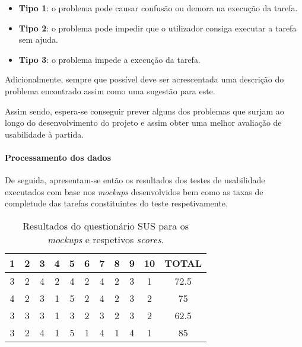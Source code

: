 \begin{itemize}
\item \textbf{Tipo 1}: o problema pode causar confusão ou demora na execução da tarefa.
\item \textbf{Tipo 2}: o problema pode impedir que o utilizador consiga executar a tarefa
sem ajuda.
\item \textbf{Tipo 3}: o problema impede a execução da tarefa.
\end{itemize}

Adicionalmente, sempre que possível deve ser acrescentada uma descrição do
problema encontrado assim como uma sugestão para este.

Assim sendo, espera-se conseguir prever alguns dos problemas que surjam ao
longo do desenvolvimento do projeto e assim obter uma melhor avaliação de
usabilidade à partida.

\paragraph{Processamento dos dados}
\label{sec:org2d14279}

De seguida, apresentam-se então os resultados dos testes de usabilidade executados com base nos \textit{mockups} desenvolvidos bem como as taxas de completude das tarefas constituintes do teste respetivamente.

\begin{table}[H]
\centering
\caption{Resultados do questionário SUS para os \textit{mockups} e respetivos \textit{scores}.}
\begin{tabular}{ccccccccccc}
\hline
\rowcolor[HTML]{EFEFEF} 
\textbf{1} & \textbf{2} & \textbf{3} & \textbf{4} & \textbf{5} & \textbf{6} & \textbf{7} & \textbf{8} & \textbf{9} & \textbf{10} & \textbf{TOTAL} \\ \hline
3          & 2          & 4          & 2          & 4          & 2          & 4          & 2          & 3          & 1           & 72.5           \\
4          & 2          & 3          & 1          & 5          & 2          & 4          & 2          & 3          & 2           & 75             \\
3          & 3          & 3          & 1          & 3          & 2          & 3          & 2          & 3          & 2           & 62.5           \\
3          & 2          & 4          & 1          & 5          & 1          & 4          & 1          & 4          & 1           & 85             \\ \hline
\end{tabular}
\end{table}


